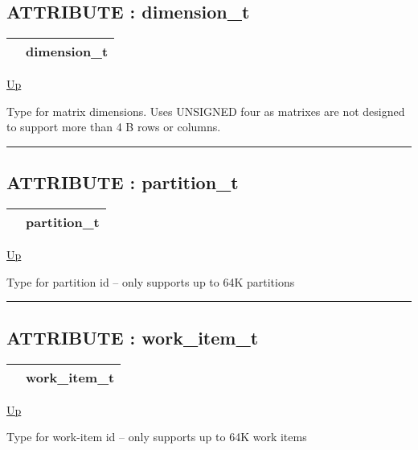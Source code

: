 \subsection*{ATTRIBUTE : dimension\_t}
\hypertarget{ecldoc:pbblas.types.dimension_t}{}

{\renewcommand{\arraystretch}{1.5}
\begin{tabularx}{\textwidth}{|>{\raggedright\arraybackslash}l|X|}
\hline
\hspace{0pt} & dimension\_t \\
\hline
\end{tabularx}
}

\hyperlink{ecldoc:PBblas.Types}{Up}

\par
Type for matrix dimensions. Uses UNSIGNED four as matrixes are not designed to support more than 4 B rows or columns.


\rule{\textwidth}{0.4pt}
\subsection*{ATTRIBUTE : partition\_t}
\hypertarget{ecldoc:pbblas.types.partition_t}{}

{\renewcommand{\arraystretch}{1.5}
\begin{tabularx}{\textwidth}{|>{\raggedright\arraybackslash}l|X|}
\hline
\hspace{0pt} & partition\_t \\
\hline
\end{tabularx}
}

\hyperlink{ecldoc:PBblas.Types}{Up}

\par
Type for partition id -- only supports up to 64K partitions


\rule{\textwidth}{0.4pt}
\subsection*{ATTRIBUTE : work\_item\_t}
\hypertarget{ecldoc:pbblas.types.work_item_t}{}

{\renewcommand{\arraystretch}{1.5}
\begin{tabularx}{\textwidth}{|>{\raggedright\arraybackslash}l|X|}
\hline
\hspace{0pt} & work\_item\_t \\
\hline
\end{tabularx}
}

\hyperlink{ecldoc:PBblas.Types}{Up}

\par
Type for work-item id -- only supports up to 64K work items



